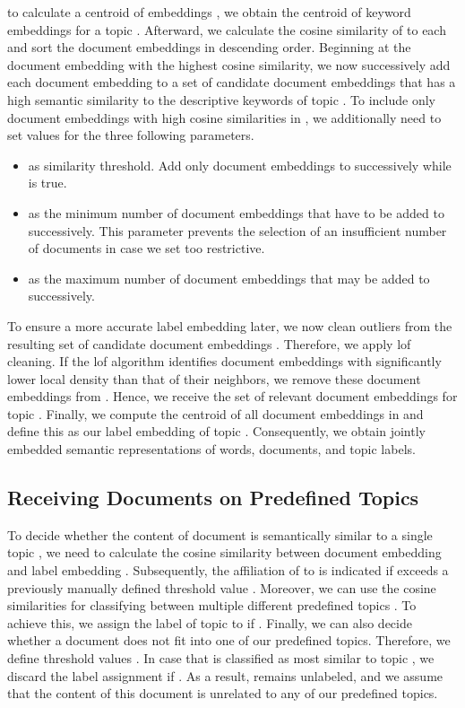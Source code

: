 \documentclass[a4paper,twoside]{article}
\begin{document}
to calculate a centroid  of embeddings , we obtain the centroid  of keyword embeddings for a topic .
Afterward, we calculate the cosine similarity of  to each  and sort the document embeddings in descending order. Beginning at the document embedding with the highest cosine similarity, we now successively add each document embedding to a set of candidate document embeddings  that has a high semantic similarity to the descriptive keywords of topic . To include only document embeddings with high cosine similarities in , we additionally need to set values for the three following parameters.
\begin{itemize}[itemsep=2pt,parsep=2pt]
\item  as similarity threshold. Add only document embeddings to  successively while  is true.
    \item  as the minimum number of document embeddings that have to be added to  successively. This parameter prevents the selection of an insufficient number of documents in case we set  too restrictive.
    \item  as the maximum number of document embeddings that may be added to  successively.
\end{itemize}
To ensure a more accurate label embedding later, we now clean outliers from the resulting set of candidate document embeddings . Therefore, we apply \ac{lof} \citep{breuning-etal-2000} cleaning. If the \ac{lof} algorithm identifies document embeddings  with significantly lower local density than that of their neighbors, we remove these document embeddings from . Hence, we receive the set of relevant document embeddings  for topic . Finally, we compute the centroid of all document embeddings in  and define this as our label embedding  of topic . Consequently, we obtain jointly embedded semantic representations of words, documents, and topic labels.

\subsection{Receiving Documents on Predefined Topics}

To decide whether the content of document  is semantically similar to a single topic , we need to calculate the cosine similarity between document embedding  and label embedding . Subsequently, the affiliation of  to  is indicated if  exceeds a previously manually defined threshold value . Moreover, we can use the cosine similarities for classifying  between multiple different predefined topics . To achieve this, we assign the label of topic  to  if . Finally, we can also decide whether a document  does not fit into one of our predefined topics. Therefore, we define threshold values . In case that  is classified as most similar to topic , we discard the label assignment if . As a result,  remains unlabeled, and we assume that the content of this document is unrelated to any of our predefined topics. 
\end{document}
